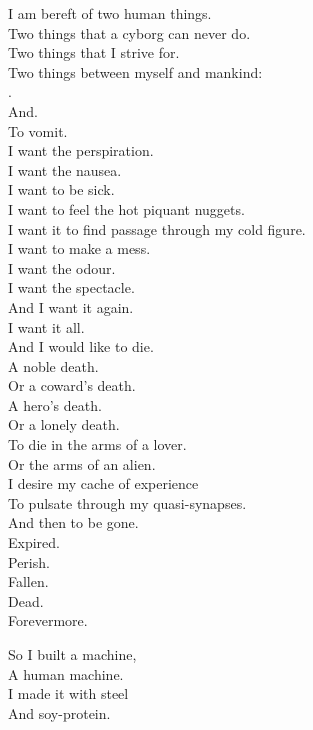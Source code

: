 I am bereft of two human things. \\
Two things that a cyborg can never do. \\
Two things that I strive for. \\
Two things between myself and mankind: \\

. \\
And. \\
To vomit. \\

I want the perspiration. \\
I want the nausea. \\
I want to be sick. \\
I want to feel the hot piquant nuggets. \\
I want it to find passage through my cold figure. \\
I want to make a mess. \\
I want the odour. \\
I want the spectacle. \\
And I want it again. \\
I want it all. \\

And I would like to die. \\
A noble death. \\
Or a coward's death. \\
A hero's death. \\
Or a lonely death. \\
To die in the arms of a lover. \\
Or the arms of an alien. \\
I desire my cache of experience \\
To pulsate through my quasi-synapses. \\
And then to be gone. \\
Expired. \\
Perish. \\
Fallen. \\
Dead. \\
Forevermore. \\





So I built a machine, \\
A human machine. \\
I made it with steel \\
And soy-protein. \\

